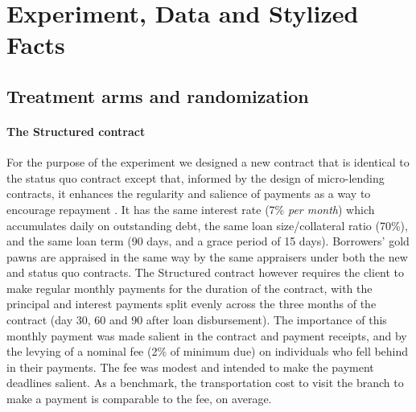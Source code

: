 \documentclass[12pt, a4paper, colorinlistoftodos]{article}
\begin{document}


\vspace{.2in}
\section{Experiment, Data and Stylized Facts} \label{Design}

\subsection{Treatment arms and randomization}

\paragraph*{The Structured contract} For the purpose of the experiment we designed a new contract that is identical to the status quo contract except that, informed by the design of micro-lending contracts, it enhances the regularity and salience of payments as a way to encourage repayment \citep{morduch1999microfinance, bauer2012behavioral}.  It has the same interest rate (7\% \textit{per month}) which accumulates daily on outstanding debt, the same loan size/collateral ratio (70\%), and the same loan term (90 days, and a grace period of 15 days). Borrowers' gold pawns are appraised in the same way by the same appraisers under both the new and status quo contracts. The Structured contract however requires the client to make regular monthly payments for the duration of the contract, with the principal and interest payments split evenly across the three months of the contract (day 30, 60 and 90 after loan disbursement).  The importance of this monthly payment was made salient in the contract and payment receipts, and by the levying of a nominal fee (2\% of minimum due) on individuals who fell behind in their payments. %
The fee was modest and intended to make the payment deadlines salient. As a benchmark, the transportation cost to visit the branch to make a payment is comparable to the fee, on average.
\end{document}
